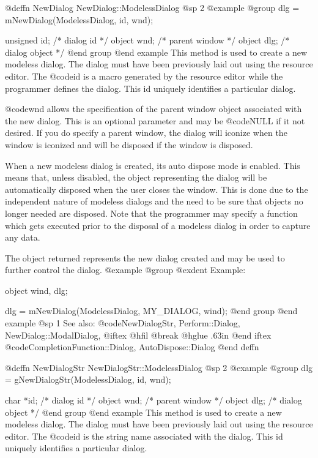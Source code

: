 @deffn {NewDialog} NewDialog::ModelessDialog
@sp 2
@example
@group
dlg = mNewDialog(ModelessDialog, id, wnd);

unsigned  id;   /*  dialog id      */
object    wnd;  /*  parent window  */
object    dlg;  /*  dialog object  */
@end group
@end example
This method is used to create a new modeless dialog.  The dialog must have
been previously laid out using the resource editor.  The @code{id}
is a macro generated by the resource editor while the programmer defines
the dialog.  This id uniquely identifies a particular dialog.

@code{wnd} allows the specification of the parent window object associated
with the new dialog.  This is an optional parameter and may be @code{NULL}
if it not desired.  If you do specify a parent window, the dialog will
iconize when the window is iconized and will be disposed if the window
is disposed.

When a new modeless dialog is created, its auto dispose mode is enabled.
This means that, unless disabled, the object representing the dialog
will be automatically disposed when the user closes the window.  This
is done due to the independent nature of modeless dialogs and the need
to be sure that objects no longer needed are disposed.  Note that the
programmer may specify a function which gets executed prior to the
disposal of a modeless dialog in order to capture any data.

The object returned represents the new dialog created and may be
used to further control the dialog.
@example
@group
@exdent Example:

object  wind, dlg;

dlg = mNewDialog(ModelessDialog, MY_DIALOG, wind);
@end group
@end example
@sp 1
See also:  @code{NewDialogStr, Perform::Dialog, NewDialog::ModalDialog,}
@iftex
@hfil @break @hglue .63in 
@end iftex
@code{CompletionFunction::Dialog, AutoDispose::Dialog}
@end deffn












@deffn {NewDialogStr} NewDialogStr::ModelessDialog
@sp 2
@example
@group
dlg = gNewDialogStr(ModelessDialog, id, wnd);

char      *id;  /*  dialog id      */
object    wnd;  /*  parent window  */
object    dlg;  /*  dialog object  */
@end group
@end example
This method is used to create a new modeless dialog.  The dialog must have
been previously laid out using the resource editor.  The @code{id} is
the string name associated with the dialog.  This id uniquely identifies
a particular dialog.


